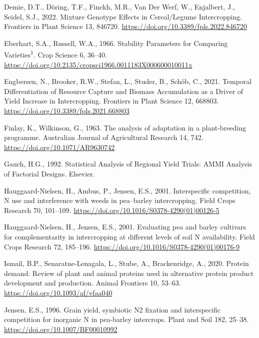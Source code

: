 \documentclass[
  british,
  a4paper,
  DIV=11,
  numbers=noendperiod]{scrreprt}
\newlength{\cslhangindent}
\newenvironment{CSLReferences}[2] %
 {\begin{list}{}{%
  \setlength{\itemindent}{0pt}
  \setlength{\leftmargin}{0pt}
  \setlength{\parsep}{0pt}
  \ifodd #1
   \setlength{\leftmargin}{\cslhangindent}
   \setlength{\itemindent}{-1\cslhangindent}
  \fi
  \setlength{\itemsep}{#2\baselineskip}}}
 {\end{list}}
\begin{document}
\begin{CSLReferences}{1}{0}
Demie, D.T., Döring, T.F., Finckh, M.R., Van Der Werf, W., Enjalbert,
J., Seidel, S.J., 2022. Mixture \texttimes{} {Genotype Effects} in
{Cereal}/{Legume Intercropping}. Frontiers in Plant Science 13, 846720.
\url{https://doi.org/10.3389/fpls.2022.846720}

Eberhart, S.A., Russell, W.A., 1966. Stability {Parameters} for
{Comparing Varieties}{\textsuperscript{1}}. Crop Science 6, 36--40.
\url{https://doi.org/10.2135/cropsci1966.0011183X000600010011x}

Engbersen, N., Brooker, R.W., Stefan, L., Studer, B., Schöb, C., 2021.
Temporal {Differentiation} of {Resource Capture} and {Biomass
Accumulation} as a {Driver} of {Yield Increase} in {Intercropping}.
Frontiers in Plant Science 12, 668803.
\url{https://doi.org/10.3389/fpls.2021.668803}

Finlay, K., Wilkinson, G., 1963. The analysis of adaptation in a
plant-breeding programme. Australian Journal of Agricultural Research
14, 742. \url{https://doi.org/10.1071/AR9630742}

Gauch, H.G., 1992. Statistical {Analysis} of {Regional Yield Trials}:
{AMMI Analysis} of {Factorial Designs}. Elsevier.

Hauggaard-Nielsen, H., Ambus, P., Jensen, E.S., 2001. Interspecific
competition, {N} use and interference with weeds in pea--barley
intercropping. Field Crops Research 70, 101--109.
\url{https://doi.org/10.1016/S0378-4290(01)00126-5}

Hauggaard-Nielsen, H., Jensen, E.S., 2001. Evaluating pea and barley
cultivars for complementarity in intercropping at different levels of
soil {N} availability. Field Crops Research 72, 185--196.
\url{https://doi.org/10.1016/S0378-4290(01)00176-9}

Ismail, B.P., Senaratne-Lenagala, L., Stube, A., Brackenridge, A., 2020.
Protein demand: Review of plant and animal proteins used in alternative
protein product development and production. Animal Frontiers 10, 53--63.
\url{https://doi.org/10.1093/af/vfaa040}

Jensen, E.S., 1996. Grain yield, symbiotic {N2} fixation and
interspecific competition for inorganic {N} in pea-barley intercrops.
Plant and Soil 182, 25--38. \url{https://doi.org/10.1007/BF00010992}


\end{CSLReferences}
\end{document}
